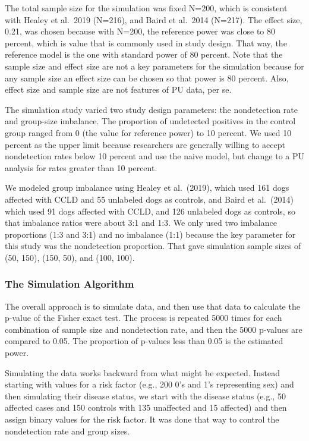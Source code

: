 \documentclass[
]{article}
\begin{document}
The total sample size for the simulation was fixed N=200, which is
consistent with Healey et al.~2019 (N=216), and Baird et al.~2014
(N=217). \cite{bcioa14} \cite{hmhcbhkr19} The effect size, 0.21, was
chosen because with N=200, the reference power was close to 80 percent,
which is value that is commonly used in study design. That way, the
reference model is the one with standard power of 80 percent. Note that
the sample size and effect size are not a key parameters for the
simulation because for any sample size an effect size can be chosen so
that power is 80 percent. Also, effect size and sample size are not
features of PU data, per se.

The simulation study varied two study design parameters: the
nondetection rate and group-size imbalance. The proportion of undetected
positives in the control group ranged from 0 (the value for reference
power) to 10 percent. We used 10 percent as the upper limit because
researchers are generally willing to accept nondetection rates below 10
percent and use the naive model, but change to a PU analysis for rates
greater than 10 percent. \cite{bd20}

We modeled group imbalance using Healey et al.~(2019), which used 161
dogs affected with CCLD and 55 unlabeled dogs as controls, and Baird et
al.~(2014) which used 91 dogs affected with CCLD, and 126 unlabeled dogs
as controls, so that imbalance ratios were about 3:1 and 1:3.
\cite{bcioa14} \cite{hmhcbhkr19} We only used two imbalance proportions
(1:3 and 3:1) and no imbalance (1:1) because the key parameter for this
study was the nondetection proportion. That gave simulation sample sizes
of (50, 150), (150, 50), and (100, 100).

\pagebreak

\hypertarget{the-simulation-algorithm}{%
\subsubsection{The Simulation
Algorithm}\label{the-simulation-algorithm}}

The overall approach is to simulate data, and then use that data to
calculate the p-value of the Fisher exact test. The process is repeated
5000 times for each combination of sample size and nondetection rate,
and then the 5000 p-values are compared to 0.05. The proportion of
p-values less than 0.05 is the estimated power.

Simulating the data works backward from what might be expected. Instead
starting with values for a risk factor (e.g., 200 0's and 1's
representing sex) and then simulating their disease status, we start
with the disease status (e.g., 50 affected cases and 150 controls with
135 unaffected and 15 affected) and then assign binary values for the
risk factor. It was done that way to control the nondetection rate and
group sizes.
\end{document}
